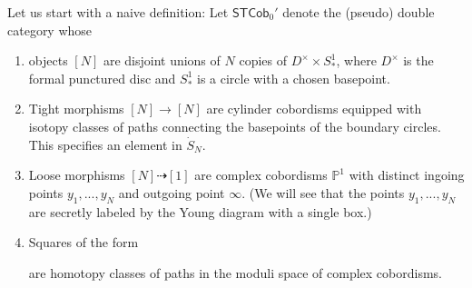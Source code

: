 \documentclass[11pt]{report}
\theoremstyle{definition}
\theoremstyle{remark}
\theoremstyle{remark}
\newcommand{\id}{\textnormal{id}}
\renewcommand{\P}{\mathbb{P}}
\begin{document}
Let us start with a naive definition: Let $\mathsf{STCob}_0'$ denote the (pseudo) double category \cite{article:hansen:2019} whose
\begin{enumerate}[label=(\roman*)]
\item objects $[N]$ are disjoint unions of $N$ copies of $D^\times \times S_*^1$, where $D^\times$ is the formal punctured disc and $S_*^1$ is a circle with a chosen basepoint.
\item Tight morphisms $[N] \to [N]$ are cylinder cobordisms equipped with isotopy classes of paths connecting the basepoints of the boundary circles. This specifies an element in $\dot S_N$.
\item Loose morphisms $[N] \dashrightarrow [1]$ are complex cobordisms $\P^1$ with distinct ingoing points $y_1,...,y_N$ and outgoing point $\infty$. (We will see that the points $y_1,...,y_N$ are secretly labeled by the Young diagram with a single box.)
\item Squares of the form
\begin{center}
\end{center}
are homotopy classes of paths in the moduli space of complex cobordisms.
\end{enumerate}
\end{document}
